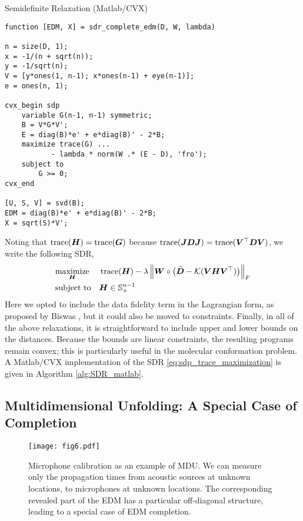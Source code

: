 \documentclass[10pt,double]{IEEEtran}
\renewcommand{\S}{\ensuremath{\mathbb{S}}}
\providecommand{\norm}[1]{\left\lVert#1\right\rVert}
\providecommand{\mat}[1]{\ensuremath{\boldsymbol{#1}}}
\providecommand{\wt}[1]{\ensuremath{\widetilde{#1}}}
\providecommand{\mV}{\mat{V}} \providecommand{\mT}{\mat{T}}
\providecommand{\mW}{\mat{W}}
\newcommand{\EDMgram}{\ensuremath{\mathcal{K}}}
\newcommand{\T}{\ensuremath{\top}}
\newcommand{\trace}{\ensuremath{\mathop{\mathrm{trace}}}}
\begin{document}
\begin{algorithm}[t]
\caption{{Semidefinite Relaxation (Matlab/CVX)}}
\vspace{-5mm}
\begin{lstlisting}
function [EDM, X] = sdr_complete_edm(D, W, lambda)

n = size(D, 1);
x = -1/(n + sqrt(n));
y = -1/sqrt(n);
V = [y*ones(1, n-1); x*ones(n-1) + eye(n-1)];
e = ones(n, 1);

cvx_begin sdp
    variable G(n-1, n-1) symmetric;
    B = V*G*V';
    E = diag(B)*e' + e*diag(B)' - 2*B;
    maximize trace(G) ...
           - lambda * norm(W .* (E - D), 'fro');
    subject to
        G >= 0;
cvx_end

[U, S, V] = svd(B);
EDM = diag(B)*e' + e*diag(B)' - 2*B;
X = sqrt(S)*V';
\end{lstlisting}
\label{alg:SDR_matlab}
\end{algorithm}


Noting that $\trace(\mH) = \trace(\mG)$ because $\trace(\mJ \mD \mJ) =
\trace(\mV^\T \mD \mV)$, we write the following SDR,
\begin{align}
\label{eq:sdp_trace_maximization}
& \underset{\mH}{\text{maximize}}
& & \trace(\mH) - \lambda \norm{\mW \circ \big(\wt{\mD} - \EDMgram (\mV \mH \mV^\T)\big)}_F \nonumber \\
& \text{subject to}
  & & \mH \in \S^{n-1}_+ 
\end{align}
Here we opted to include the data fidelity term in the Lagrangian form, as
proposed by Biswas
\cite{Biswas:2006cm}, but it could also be moved to constraints. Finally, in all of
the above relaxations, it is straightforward to include upper and lower bounds
on the distances. Because the bounds are linear constraints, the resulting
programs remain convex; this is particularly useful in the molecular
conformation problem. A Matlab/CVX \cite{cvx,gb08} implementation of the SDR
\eqref{eq:sdp_trace_maximization} is given in Algorithm \ref{alg:SDR_matlab}.



\subsection{Multidimensional Unfolding: A Special Case of Completion} \label{sub:box_unfolding}

\begin{figure}
\centering
\texttt{[image: fig6.pdf]}
\caption{Microphone calibration as an example of MDU. We can measure only the
propagation times from acoustic sources at unknown locations, to microphones
at unknown locations. The corresponding revealed part of the EDM has a
particular off-diagonal structure, leading to a special case of EDM
completion.}
\label{fig:mdu}
\end{figure}
\end{document}
